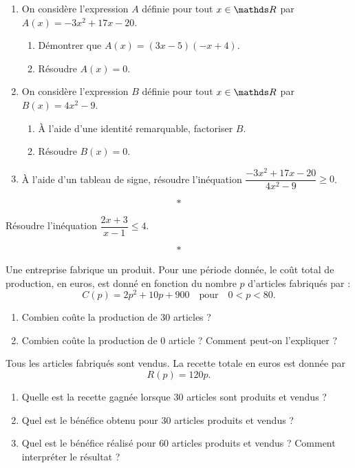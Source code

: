 \documentclass[11pt,openright,twoside,french]{book}
\begin{document}
\medskip

\exo
\begin{enumerate}
    \item On considère l'expression $A$ définie pour tout $x \in \R$ par $A(x) = -3x^2 + 17x - 20$.
    \begin{enumerate}
        \item Démontrer que $A(x) = (3x - 5)(-x + 4)$.
        \item Résoudre $A(x) = 0$.
    \end{enumerate}
    \item On considère l'expression $B$ définie pour tout $x \in \R$ par $B(x) = 4x^2 - 9$.
    \begin{enumerate}
        \item À l'aide d'une identité remarquable, factoriser $B$.
        \item Résoudre $B(x) = 0$.
    \end{enumerate}
    \item À l'aide d'un tableau de signe, résoudre l'inéquation $\dfrac{-3x^2 + 17x - 20}{4x^2 - 9} \geq 0$.
\end{enumerate}\medskip

\[*\]\medskip

\exo Résoudre l'inéquation $\dfrac{2x + 3}{x - 1} \leq 4$.\medskip

\[*\]\medskip

\exo Une entreprise fabrique un produit. Pour une période donnée, le coût total de production, en euros, est donné en fonction du nombre $p$ d'articles fabriqués par :
\[C(p) = 2p^2 + 10p + 900 \quad \text{pour}\quad 0 < p < 80.\]

\begin{enumerate}
    \item Combien coûte la production de $30$ articles ?
    \item Combien coûte la production de $0$ article ? Comment peut-on l'expliquer ?
\end{enumerate}\medskip

Tous les articles fabriqués sont vendus. La recette totale en euros est donnée par \[R(p) = 120p.\]

\begin{enumerate}[resume]
    \item Quelle est la recette gagnée lorsque $30$ articles sont produits et vendus ?
    \item Quel est le bénéfice obtenu pour $30$ articles produits et vendus ?
    \item Quel est le bénéfice réalisé pour $60$ articles produits et vendus ? Comment interpréter le résultat ?
\end{enumerate}\medskip
\end{document}

